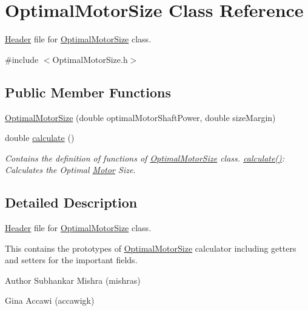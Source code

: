 \hypertarget{class_optimal_motor_size}{}\section{Optimal\+Motor\+Size Class Reference}
\label{class_optimal_motor_size}


\hyperlink{class_header}{Header} file for \hyperlink{class_optimal_motor_size}{Optimal\+Motor\+Size} class.  




{\ttfamily \#include $<$Optimal\+Motor\+Size.\+h$>$}

\subsection*{Public Member Functions}
\begin{DoxyCompactItemize}
\item 
\hyperlink{class_optimal_motor_size_ad051dd00b8879fc4232536c936e98be1}{Optimal\+Motor\+Size} (double optimal\+Motor\+Shaft\+Power, double size\+Margin)
\item 
double \hyperlink{class_optimal_motor_size_aa9f4e68b9e1807d20e7738cd0789a539}{calculate} ()
\begin{DoxyCompactList}\small\item\em Contains the definition of functions of \hyperlink{class_optimal_motor_size}{Optimal\+Motor\+Size} class. \hyperlink{class_optimal_motor_size_aa9f4e68b9e1807d20e7738cd0789a539}{calculate()}\+: Calculates the Optimal \hyperlink{struct_motor}{Motor} Size. \end{DoxyCompactList}\end{DoxyCompactItemize}


\subsection{Detailed Description}
\hyperlink{class_header}{Header} file for \hyperlink{class_optimal_motor_size}{Optimal\+Motor\+Size} class. 

This contains the prototypes of \hyperlink{class_optimal_motor_size}{Optimal\+Motor\+Size} calculator including getters and setters for the important fields.

\begin{DoxyAuthor}{Author}
Subhankar Mishra (mishras) 

Gina Accawi (accawigk) 
\end{DoxyAuthor}


